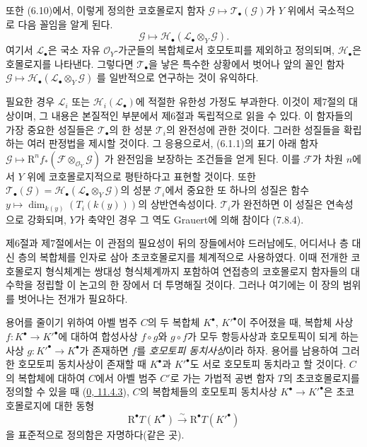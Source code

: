 \begin{env}[6.1.2]
\label{III.6.1.2-fr}
또한 (6.10)에서, 이렇게 정의한 코호몰로지 함자
$\mathscr G\mapsto\mathscr T_\bullet(\mathscr G)$가 $Y$ 위에서 국소적으로
다음 꼴임을 알게 된다.
\[
  \mathscr G\longmapsto
  \mathscr H_\bullet(\mathscr L_\bullet\otimes_Y\mathscr G).
\]
여기서 $\mathscr L_\bullet$은 국소 자유 $\mathscr O_Y$-가군들의 복합체로서
호모토피를 제외하고 정의되며, $\mathscr H_\bullet$은 호몰로지를 나타낸다.
그렇다면 $\mathscr T_\bullet$을 낳은 특수한 상황에서 벗어나 앞의 꼴인 함자
$\mathscr G\mapsto\mathscr H_\bullet(\mathscr L_\bullet\otimes_Y\mathscr G)$
를 일반적으로 연구하는 것이 유익하다.


필요한 경우 $\mathscr L_i$ 또는
$\mathscr H_i(\mathscr L_\bullet)$에 적절한 유한성 가정도 부과한다. 이것이
제7절의 대상이며, 그 내용은 본질적인 부분에서 제6절과 독립적으로 읽을 수
있다. 이 함자들의 가장 중요한 성질들은 $\mathscr T_\bullet$의 한 성분
$\mathscr T_i$의 완전성에 관한 것이다. 그러한 성질들을 확립하는 여러
판정법을 제시할 것이다. 그 응용으로서, (6.1.1)의 표기 아래 함자
$\mathscr G\mapsto\mathrm R^n f_*(\mathscr F\otimes_{\mathscr O_Y}\mathscr G)$
가 완전임을 보장하는 조건들을 얻게 된다. 이를 $\mathscr F$가 차원 $n$에서
$Y$ 위에 코호몰로지적으로 평탄하다고 표현할 것이다. 또한
$\mathscr T_\bullet(\mathscr G)=
\mathscr H_\bullet(\mathscr L_\bullet\otimes_Y\mathscr G)$의 성분
$\mathscr T_i$에서 중요한 또 하나의 성질은 함수
$y\mapsto\dim_{k(y)}(T_i(k(y)))$의 상반연속성이다. $\mathscr T_i$가
완전하면 이 성질은 연속성으로 강화되며, $Y$가 축약인 경우 그 역도
Grauert에 의해 참이다 (7.8.4).
\end{env}

\begin{env}[6.1.3]
\label{III.6.1.3-fr}
제6절과 제7절에서는 이 관점의 필요성이 뒤의 장들에서야 드러남에도,
어디서나 층 대신 층의 복합체를 인자로 삼아 초코호몰로지를 체계적으로
사용하였다. 이때 전개한 코호몰로지 형식체계는 쌍대성 형식체계까지
포함하여 연접층의 코호몰로지 함자들의 대수학을 정립할 이 논고의 한
장에서 더 투명해질 것이다. 그러나 여기에는 이 장의 범위를 벗어나는
전개가 필요하다.
\end{env}

\begin{env}[6.1.4]
\label{III.6.1.4-fr}
용어를 줄이기 위하여 아벨 범주 $C$의 두 복합체 $K^\bullet$,
$K'^\bullet$이 주어졌을 때, 복합체 사상
$f:K^\bullet\to K'^\bullet$에 대하여 합성사상 $f\circ g$와
$g\circ f$가 모두 항등사상과 호모토픽이 되게 하는 사상
$g:K'^\bullet\to K^\bullet$가 존재하면 $f$를 \emph{호모토피
동치사상}이라 하자. 용어를 남용하여 그러한 호모토피 동치사상이 존재할
때 $K^\bullet$과 $K'^\bullet$도 서로 호모토피 동치라고 할 것이다.
$C$의 복합체에 대하여 $C$에서 아벨 범주 $C'$로 가는 가법적 공변 함자
$T$의 초코호몰로지를 정의할 수 있을 때
(\hyperref[0.11.4.3-fr]{0, 11.4.3}), $C$의 복합체들의 호모토피
동치사상 $K^\bullet\to K'^\bullet$은 초코호몰로지에 대한 동형
\[
  \mathrm R^\bullet T(K^\bullet)\xrightarrow{\sim}
  \mathrm R^\bullet T(K'^\bullet)
\]
을 표준적으로 정의함은 자명하다(같은 곳).
\end{env}

